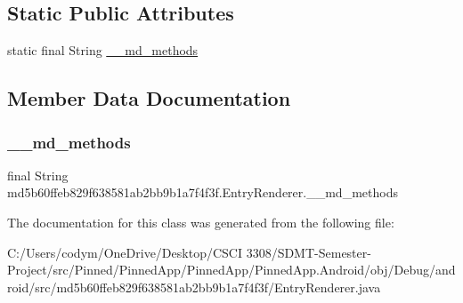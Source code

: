 \subsection*{Static Public Attributes}
\begin{DoxyCompactItemize}
\item 
static final String \hyperlink{classmd5b60ffeb829f638581ab2bb9b1a7f4f3f_1_1_entry_renderer_ad2206e7a8e60b685459381a385bdf9f1}{\+\_\+\+\_\+md\+\_\+methods}
\end{DoxyCompactItemize}


\subsection{Member Data Documentation}
\mbox{\label{classmd5b60ffeb829f638581ab2bb9b1a7f4f3f_1_1_entry_renderer_ad2206e7a8e60b685459381a385bdf9f1}} 
\subsubsection{\texorpdfstring{\+\_\+\+\_\+md\+\_\+methods}{\_\_md\_methods}}
{\footnotesize\ttfamily final String md5b60ffeb829f638581ab2bb9b1a7f4f3f.\+Entry\+Renderer.\+\_\+\+\_\+md\+\_\+methods\hspace{0.3cm}{\ttfamily [static]}}



The documentation for this class was generated from the following file\+:\begin{DoxyCompactItemize}
\item 
C\+:/\+Users/codym/\+One\+Drive/\+Desktop/\+C\+S\+C\+I 3308/\+S\+D\+M\+T-\/\+Semester-\/\+Project/src/\+Pinned/\+Pinned\+App/\+Pinned\+App/\+Pinned\+App.\+Android/obj/\+Debug/android/src/md5b60ffeb829f638581ab2bb9b1a7f4f3f/Entry\+Renderer.\+java\end{DoxyCompactItemize}

